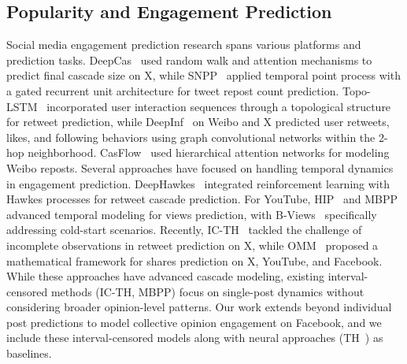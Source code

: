 \subsection{Popularity and Engagement Prediction}
Social media engagement prediction research spans various platforms and prediction tasks. 
DeepCas~\citep{li2017deepcas} used random walk and attention mechanisms to predict final cascade size on X, while SNPP~\citep{ding2019social} applied temporal point process with a gated recurrent unit architecture for tweet repost count prediction.
Topo-LSTM~\citep{wang2017topological} incorporated user interaction sequences through a topological structure for retweet prediction, while DeepInf~\citep{qiu2018deepinf} on Weibo and X predicted user retweets, likes, and following behaviors using graph convolutional networks within the 2-hop neighborhood. 
CasFlow~\citep{xu2021casflow} used hierarchical attention networks for modeling Weibo reposts.
Several approaches have focused on handling temporal dynamics in engagement prediction. DeepHawkes~\citep{cao2017deephawkes} integrated reinforcement learning with Hawkes processes for retweet cascade prediction.
For YouTube, HIP~\citep{rizoiu2017expecting} and MBPP~\citep{rizoiu2022interval} advanced temporal modeling for views prediction, with B-Views~\citep{wu2018beyond} specifically addressing cold-start scenarios.
Recently, IC-TH~\citep{kong2023interval} tackled the challenge of incomplete observations in retweet prediction on X, while OMM~\citep{calderon2024opinion} proposed a mathematical framework for shares prediction on X, YouTube, and Facebook.
While these approaches have advanced cascade modeling, existing interval-censored methods (IC-TH, MBPP) focus on single-post dynamics without considering broader opinion-level patterns. Our work extends beyond individual post predictions to model collective opinion engagement on Facebook, and we include these interval-censored models along with neural approaches (TH~\cite{zuo2020transformer}) as baselines.

